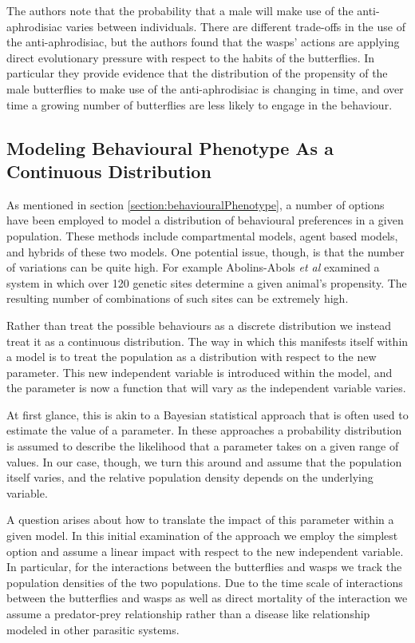 \documentclass[12pt]{article}
\begin{document}
The authors\cite{10.1093/beheco/arq007} note that the probability that
a male will make use of the anti-aphrodisiac varies between
individuals. There are different trade-offs in the use of the
anti-aphrodisiac, but the authors found that the wasps' actions are
applying direct evolutionary pressure with respect to the habits of
the butterflies. In particular they provide evidence that the
distribution of the propensity of the male butterflies to make use of
the anti-aphrodisiac is changing in time, and over time a growing
number of butterflies are less likely to engage in the behaviour.

\subsection{Modeling Behavioural Phenotype As a Continuous
  Distribution}

As mentioned in section \ref{section:behaviouralPhenotype}, a number
of options have been employed to model a distribution of behavioural
preferences in a given population. These methods include compartmental
models, agent based models, and hybrids of these two models. One
potential issue, though, is that the number of variations can be quite
high. For example Abolins-Abols \textit{et al} examined a system in
which over 120 genetic sites determine a given animal's
propensity\cite{doi:10.1111/mec.14878}. The resulting number of
combinations of such sites can be extremely high.

Rather than treat the possible behaviours as a discrete distribution
we instead treat it as a continuous distribution. The way in which
this manifests itself within a model is to treat the population as a
distribution with respect to the new parameter. This new independent
variable is introduced within the model, and the parameter is now a
function that will vary as the independent variable varies.

At first glance, this is akin to a Bayesian statistical approach that
is often used to estimate the value of a
parameter\cite{doi:10.1111/j.1467-9868.2007.00610.x,Fitzpatrick_1991}. In
these approaches a probability distribution is assumed to describe the
likelihood that a parameter takes on a given range of values. In our
case, though, we turn this around and assume that the population
itself varies, and the relative population density depends on the
underlying variable.

A question arises about how to translate the impact of this parameter
within a given model. In this initial examination of the approach we
employ the simplest option and assume a linear impact with respect to
the new independent variable. In particular, for the interactions
between the butterflies and wasps we track the population densities of
the two populations. Due to the time scale of interactions between the
butterflies and wasps as well as direct mortality of the interaction
we assume a predator-prey relationship rather than a disease like
relationship modeled in other parasitic systems.
\end{document}
